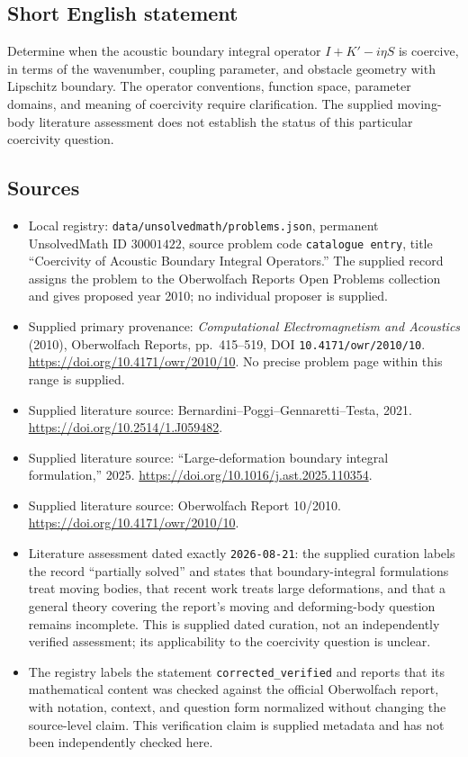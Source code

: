 \documentclass[11pt]{article}
\begin{document}
\subsection{Short English statement}
Determine when the acoustic boundary integral operator \(I+K'-i\eta S\) is coercive, in terms of the wavenumber, coupling parameter, and obstacle geometry with Lipschitz boundary. The operator conventions, function space, parameter domains, and meaning of coercivity require clarification. The supplied moving-body literature assessment does not establish the status of this particular coercivity question.
\subsection{Sources}
\begin{itemize}
\item Local registry: \texttt{data/unsolvedmath/problems.json}, permanent UnsolvedMath ID \(30001422\), source problem code \texttt{catalogue entry}, title ``Coercivity of Acoustic Boundary Integral Operators.'' The supplied record assigns the problem to the Oberwolfach Reports Open Problems collection and gives proposed year 2010; no individual proposer is supplied.
\item Supplied primary provenance: \emph{Computational Electromagnetism and Acoustics} (2010), Oberwolfach Reports, pp.\ 415--519, DOI \texttt{10.4171/owr/2010/10}. \url{https://doi.org/10.4171/owr/2010/10}. No precise problem page within this range is supplied.
\item Supplied literature source: Bernardini--Poggi--Gennaretti--Testa, 2021. \url{https://doi.org/10.2514/1.J059482}.
\item Supplied literature source: ``Large-deformation boundary integral formulation,'' 2025. \url{https://doi.org/10.1016/j.ast.2025.110354}.
\item Supplied literature source: Oberwolfach Report 10/2010. \url{https://doi.org/10.4171/owr/2010/10}.
\item Literature assessment dated exactly \texttt{2026-08-21}: the supplied curation labels the record ``partially solved'' and states that boundary-integral formulations treat moving bodies, that recent work treats large deformations, and that a general theory covering the report's moving and deforming-body question remains incomplete. This is supplied dated curation, not an independently verified assessment; its applicability to the coercivity question is unclear.
\item The registry labels the statement \texttt{corrected\_verified} and reports that its mathematical content was checked against the official Oberwolfach report, with notation, context, and question form normalized without changing the source-level claim. This verification claim is supplied metadata and has not been independently checked here.
\end{itemize}
\end{document}
